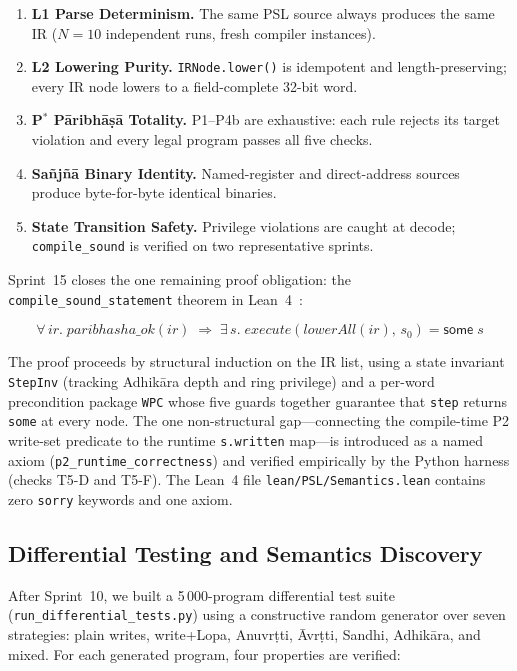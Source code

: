\documentclass[11pt,a4paper]{article}
\begin{document}
\begin{enumerate}
\item \textbf{L1 Parse Determinism.} The same PSL source always produces the
  same IR ($N=10$ independent runs, fresh compiler instances).
\item \textbf{L2 Lowering Purity.} \texttt{IRNode.lower()} is idempotent and
  length-preserving; every IR node lowers to a field-complete 32-bit word.
\item \textbf{P$^{*}$ P\={a}ribh\={a}\d{s}\={a} Totality.} P1--P4b are
  exhaustive: each rule rejects its target violation and every legal program
  passes all five checks.
\item \textbf{Sa\~{n}j\~{n}\={a} Binary Identity.} Named-register and
  direct-address sources produce byte-for-byte identical binaries.
\item \textbf{State Transition Safety.} Privilege violations are caught at
  decode; \texttt{compile\_sound} is verified on two representative sprints.
\end{enumerate}

Sprint~15 closes the one remaining proof obligation: the
\texttt{compile\_sound\_statement} theorem in Lean~4~\cite{moura2021lean4}:

\[
  \forall\, \mathit{ir}.\;
  \mathit{paribhasha\_ok}(\mathit{ir}) \;\Rightarrow\;
  \exists\, s.\;
  \mathit{execute}(\mathit{lowerAll}(\mathit{ir}),\, s_0) = \mathsf{some}\; s
\]

The proof proceeds by structural induction on the IR list, using a state
invariant \texttt{StepInv} (tracking Adhi\-k\={a}ra depth and ring privilege)
and a per-word precondition package \texttt{WPC} whose five guards together
guarantee that \texttt{step} returns \texttt{some} at every node. The one
non-structural gap---connecting the compile-time P2 write-set predicate to the
runtime \texttt{s.written} map---is introduced as a named axiom
(\texttt{p2\_runtime\_correctness}) and verified empirically by the Python
harness (checks T5-D and T5-F). The Lean~4 file \texttt{lean/PSL/Semantics.lean}
contains zero \texttt{sorry} keywords and one axiom.

\subsection{Differential Testing and Semantics Discovery}
\label{sec:diff-testing}

After Sprint~10, we built a 5\,000-program differential test suite
(\texttt{run\_differential\_tests.py}) using a constructive random generator
over seven strategies: plain writes, write+Lopa, Anuvr\d{t}ti,
\={A}vr\d{t}ti, Sandhi, Adhi\-k\={a}ra, and mixed. For each generated
program, four properties are verified:
\end{document}
